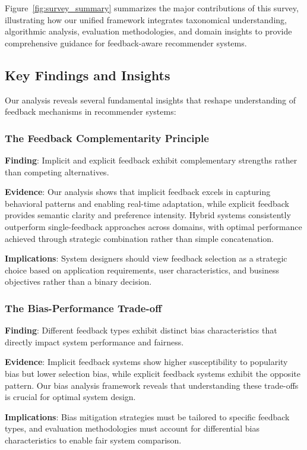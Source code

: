 Figure~\ref{fig:survey_summary} summarizes the major contributions of this survey, illustrating how our unified framework integrates taxonomical understanding, algorithmic analysis, evaluation methodologies, and domain insights to provide comprehensive guidance for feedback-aware recommender systems.

\subsection{Key Findings and Insights}

Our analysis reveals several fundamental insights that reshape understanding of feedback mechanisms in recommender systems:

\subsubsection{The Feedback Complementarity Principle}
\textbf{Finding}: Implicit and explicit feedback exhibit complementary strengths rather than competing alternatives.

\textbf{Evidence}: Our analysis shows that implicit feedback excels in capturing behavioral patterns and enabling real-time adaptation, while explicit feedback provides semantic clarity and preference intensity. Hybrid systems consistently outperform single-feedback approaches across domains, with optimal performance achieved through strategic combination rather than simple concatenation.

\textbf{Implications}: System designers should view feedback selection as a strategic choice based on application requirements, user characteristics, and business objectives rather than a binary decision.

\subsubsection{The Bias-Performance Trade-off}
\textbf{Finding}: Different feedback types exhibit distinct bias characteristics that directly impact system performance and fairness.

\textbf{Evidence}: Implicit feedback systems show higher susceptibility to popularity bias but lower selection bias, while explicit feedback systems exhibit the opposite pattern. Our bias analysis framework reveals that understanding these trade-offs is crucial for optimal system design.

\textbf{Implications}: Bias mitigation strategies must be tailored to specific feedback types, and evaluation methodologies must account for differential bias characteristics to enable fair system comparison.

